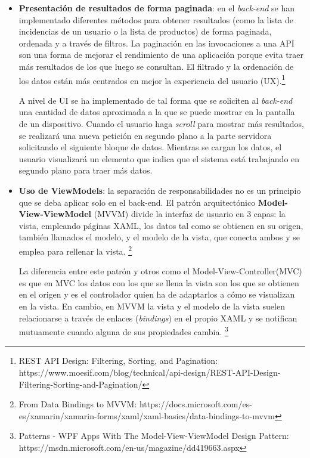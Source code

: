 \documentclass[11pt,spanish,listoffigures]{tfgetsinf}
\begin{document}
\begin{itemize}

\item \textbf{Presentación de resultados de forma paginada}: en el \textit{back-end} se han implementado diferentes métodos para obtener resultados (como la lista de incidencias de un usuario o la lista de productos) de forma paginada, ordenada y a través de filtros. La paginación en las invocaciones a una API son una forma de mejorar el rendimiento de una aplicación porque evita traer más resultados de los que luego se consultan. El filtrado y la ordenación de los datos están más centrados en mejor la experiencia del usuario (UX).\footnote{ REST API Design: Filtering, Sorting, and Pagination: https://www.moesif.com/blog/technical/api-design/REST-API-Design-Filtering-Sorting-and-Pagination/} 

A nivel de UI se ha implementado de tal forma que se soliciten al \textit{back-end} una cantidad de datos aproximada a la que se puede mostrar en la pantalla de un dispositivo. Cuando el usuario haga \textit{scroll} para mostrar más resultados, se realizará una nueva petición en segundo plano a la parte servidora solicitando el siguiente bloque de datos. Mientras se cargan los datos, el usuario visualizará un elemento que indica que el sistema está trabajando en segundo plano para traer más datos.


\item \textbf{Uso de ViewModels}: la separación de responsabilidades no es un principio que se deba aplicar solo en el back-end. El patrón arquitectónico \textbf{Model-View-ViewModel} (MVVM) divide la interfaz de usuario en 3 capas: la vista, empleando páginas XAML, los datos tal como se obtienen en su origen, también llamados el modelo, y el modelo de la vista, que conecta ambos y se emplea para rellenar la vista. \footnote{From Data Bindings to MVVM: https://docs.microsoft.com/es-es/xamarin/xamarin-forms/xaml/xaml-basics/data-bindings-to-mvvm} 

La diferencia entre este patrón y otros como el Model-View-Controller(MVC) es que en MVC los datos con los que se llena la vista son los que se obtienen en el origen y es el controlador quien ha de adaptarlos a cómo se visualizan en la vista. En cambio, en MVVM la vista y el modelo de la vista suelen relacionarse a través de enlaces (\textit{bindings}) en el propio XAML y se notifican mutuamente cuando alguna de sus propiedades cambia. \footnote{ Patterns - WPF Apps With The Model-View-ViewModel Design Pattern: https://msdn.microsoft.com/en-us/magazine/dd419663.aspx}


\end{itemize}
\end{document}
